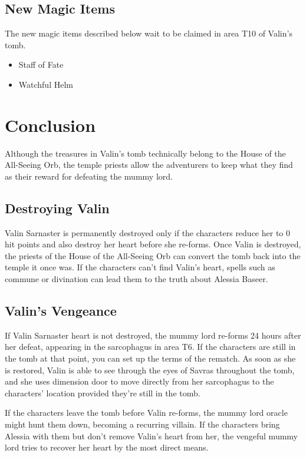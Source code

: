 \documentclass[10pt,a4paper,twoside,bg=print,twocolumn,openany,nodeprecatedcode]{dndbook}
\begin{document}
\subsection{New Magic Items}
The new magic items described below wait to be claimed in area T10 of Valin's tomb.


\begin{itemize}
\item Staff of Fate
\item Watchful Helm
\end{itemize}

\section{Conclusion}
Although the treasures in Valin's tomb technically belong to the House of the All-Seeing Orb, the temple priests allow the adventurers to keep what they find as their reward for defeating the mummy lord.

\subsection{Destroying Valin}
Valin Sarnaster is permanently destroyed only if the characters reduce her to 0 hit points and also destroy her heart before she re-forms. Once Valin is destroyed, the priests of the House of the All-Seeing Orb can convert the tomb back into the temple it once was. If the characters can't find Valin's heart, spells such as commune or divination can lead them to the truth about Alessia Baseer.

\subsection{Valin's Vengeance}
If Valin Sarnaster heart is not destroyed, the mummy lord re-forms 24 hours after her defeat, appearing in the sarcophagus in area T6. If the characters are still in the tomb at that point, you can set up the terms of the rematch. As soon as she is restored, Valin is able to see through the eyes of Savras throughout the tomb, and she uses dimension door to move directly from her sarcophagus to the characters' location provided they're still in the tomb.

If the characters leave the tomb before Valin re-forms, the mummy lord oracle might hunt them down, becoming a recurring villain. If the characters bring Alessia with them but don't remove Valin's heart from her, the vengeful mummy lord tries to recover her heart by the most direct means.
\end{document}
